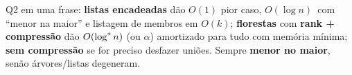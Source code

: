 \begin{chave}
Q2 em uma frase: \textbf{listas encadeadas} dão \Find{} $O(1)$ pior caso, \Union{} $O(\log n)$\am\ com ``menor na maior'' e listagem de membros em $O(k)$; \textbf{florestas} com \textbf{rank + compressão} dão $O(\log^{*} n)$ (ou $\alpha$) amortizado para tudo com memória mínima; \textbf{sem compressão} se for preciso desfazer uniões. Sempre \textbf{menor no maior}, senão árvores/listas degeneram.
\end{chave}
